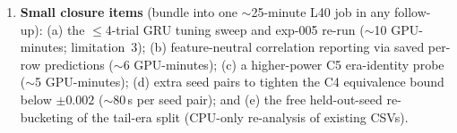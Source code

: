 \begin{enumerate}
    the C1(c) confound result. \emph{Builds on:} the saved spectra
    (\texttt{spectra.npz}) and C1 test harness. \emph{Resources:} CPU
    only---days of workstation CPU, no GPU, no cluster constraint.
  \item \textbf{Small closure items} (bundle into one $\sim$25-minute L40
    job in any follow-up): (a) the $\leq$4-trial GRU tuning sweep and
    exp-005 re-run ($\sim$10 GPU-minutes; limitation~3); (b)
    feature-neutral correlation reporting via saved per-row predictions
    ($\sim$6 GPU-minutes); (c) a higher-power C5 era-identity probe
    ($\sim$5 GPU-minutes); (d) extra seed pairs to tighten the C4
    equivalence bound below $\pm 0.002$ ($\sim$80\,s per seed pair); and
    (e) the free held-out-seed re-bucketing of the tail-era split
    (CPU-only re-analysis of existing CSVs).
\end{enumerate}
